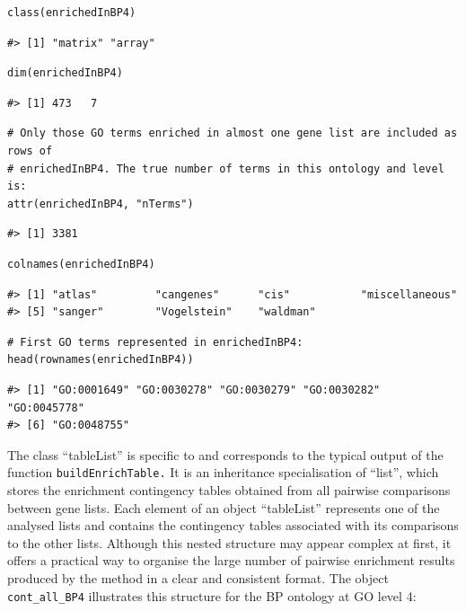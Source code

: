 \begin{verbatim}
class(enrichedInBP4)
\end{verbatim}

\begin{verbatim}
#> [1] "matrix" "array"
\end{verbatim}

\begin{verbatim}
dim(enrichedInBP4)
\end{verbatim}

\begin{verbatim}
#> [1] 473   7
\end{verbatim}

\begin{verbatim}
# Only those GO terms enriched in almost one gene list are included as rows of 
# enrichedInBP4. The true number of terms in this ontology and level is:
attr(enrichedInBP4, "nTerms")
\end{verbatim}

\begin{verbatim}
#> [1] 3381
\end{verbatim}

\begin{verbatim}
colnames(enrichedInBP4)
\end{verbatim}

\begin{verbatim}
#> [1] "atlas"         "cangenes"      "cis"           "miscellaneous"
#> [5] "sanger"        "Vogelstein"    "waldman"
\end{verbatim}

\begin{verbatim}
# First GO terms represented in enrichedInBP4:
head(rownames(enrichedInBP4))
\end{verbatim}

\begin{verbatim}
#> [1] "GO:0001649" "GO:0030278" "GO:0030279" "GO:0030282" "GO:0045778"
#> [6] "GO:0048755"
\end{verbatim}

The class ``tableList'' is specific to  and corresponds to the typical output of the function \texttt{buildEnrichTable.} It is an inheritance specialisation of ``list'', which stores the enrichment contingency tables obtained from all pairwise comparisons between gene lists. Each element of an object ``tableList'' represents one of the analysed lists and contains the contingency tables associated with its comparisons to the other lists. Although this nested structure may appear complex at first, it offers a practical way to organise the large number of pairwise enrichment results produced by the method in a clear and consistent format. The object \texttt{cont\_all\_BP4} illustrates this structure for the BP ontology at GO level 4:


